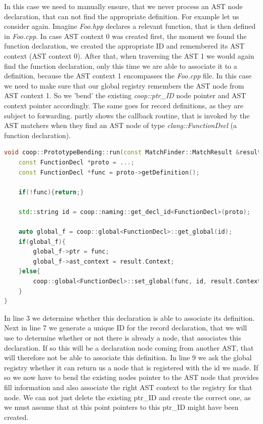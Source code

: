 In this case we need to manually ensure, that we never process an AST node declaration, that can not find the appropriate definition. For example let us consider  again. Imagine \textit{Foo.hpp} declares a relevant function, that is then defined in \textit{Foo.cpp}. In case AST context 0 was created first, the moment we found the function declaration, we created the appropriate ID and remembered its AST context (AST context 0). After that, when traversing the AST 1 we would again find the function declaration, only this time we are able to associate it to a definition, because the AST context 1 encompasses the \textit{Foo.cpp} file. In this case we need to make sure that our global registry remembers the AST node from AST context 1. So we 'bend' the existing \textit{coop::ptr\_ID} node pointer and AST context pointer accordingly. The same goes for record definitions, as they are subject to forwarding.  partly shows the callback routine, that is invoked by the AST matchers when they find an AST node of type \textit{clang::FunctionDecl} (a function declaration).
\begin{lstlisting}[language=C++, name={Shortened excerpt of the callback routine, that registers function declarations for COOP in the data aggregation step.},label={bending}]
void coop::PrototypeBending::run(const MatchFinder::MatchResult &result){
	const FunctionDecl *proto = ...;
	const FunctionDecl *func = proto->getDefinition();
	
	if(!func){return;}

	std::string id = coop::naming::get_decl_id<FunctionDecl>(proto);
	
	auto global_f = coop::global<FunctionDecl>::get_global(id);
	if(global_f){
		global_f->ptr = func;
		global_f->ast_context = result.Context;
	}else{
		coop::global<FunctionDecl>::set_global(func, id, result.Context);
	}
}
\end{lstlisting}
In line 3 we determine whether this declaration is able to associate its definition. Next in line 7 we generate a unique ID for the record declaration, that we will use to determine whether or not there is already a node, that associates this declaration. If so this will be a declaration node coming from another AST, that will therefore not be able to associate this definition. In line 9 we ask the global registry whether it can return us a node that is registered with the id we made. If so we now have to bend the existing nodes pointer to the AST node that provides fill information and also associate the right AST context to the registry for that node. We can not just delete the existing ptr\_ID and create the correct one, as we must assume that at this point pointers to this ptr\_ID might have been created.

